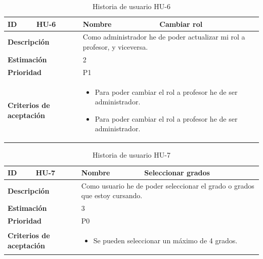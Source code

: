\begin{table}[H]
    \centering
    \begin{tabular}{|p{2cm}|p{4cm}|p{2cm}|p{4cm}|}
        \hline
        \textbf{ID} & HU-6 & \textbf{Nombre} & Cambiar rol \\
        \hline
        \multicolumn{2}{|p{6cm}|}{\textbf{Descripción}} & \multicolumn{2}{p{6cm}|}{Como administrador he de poder actualizar mi rol a profesor, y viceversa.} \\
        \hline
        \multicolumn{2}{|p{6cm}|}{\textbf{Estimación}} & \multicolumn{2}{p{6cm}|}{2} \\
        \hline
        \multicolumn{2}{|p{6cm}|}{\textbf{Prioridad}} & \multicolumn{2}{p{6cm}|}{P1} \\
        \hline
        \multicolumn{2}{|p{6cm}|}{\textbf{Criterios de aceptación}} & \multicolumn{2}{p{6cm}|}{
            \begin{itemize}
                \item Para poder cambiar el rol a profesor he de ser administrador.
                \item Para poder cambiar el rol a profesor he de ser administrador.
            \end{itemize}
        } \\
        \hline
    \end{tabular}
    \caption{Historia de usuario HU-6}
    \label{tab:hu_6}
\end{table}

\begin{table}[H]
    \centering
    \begin{tabular}{|p{2cm}|p{4cm}|p{2cm}|p{4cm}|}
        \hline
        \textbf{ID} & HU-7 & \textbf{Nombre} & Seleccionar grados \\
        \hline
        \multicolumn{2}{|p{6cm}|}{\textbf{Descripción}} & \multicolumn{2}{p{6cm}|}{Como usuario he de poder seleccionar el grado o grados que estoy cursando.} \\
        \hline
        \multicolumn{2}{|p{6cm}|}{\textbf{Estimación}} & \multicolumn{2}{p{6cm}|}{3} \\
        \hline
        \multicolumn{2}{|p{6cm}|}{\textbf{Prioridad}} & \multicolumn{2}{p{6cm}|}{P0} \\
        \hline
        \multicolumn{2}{|p{6cm}|}{\textbf{Criterios de aceptación}} & \multicolumn{2}{p{6cm}|}{
            \begin{itemize}
                \item Se pueden seleccionar un máximo de 4 grados.
            \end{itemize}
        } \\
        \hline
    \end{tabular}
    \caption{Historia de usuario HU-7}
    \label{tab:hu_7}
\end{table}


